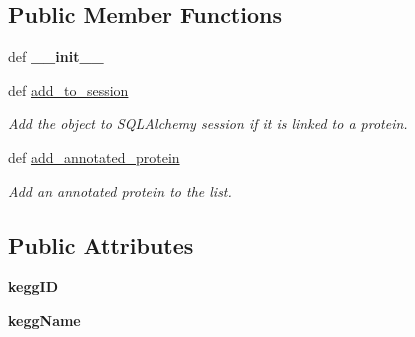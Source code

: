 \subsection*{Public Member Functions}
\begin{DoxyCompactItemize}
\item 
\hypertarget{classsrc_1_1fr_1_1tagc_1_1rainet_1_1core_1_1data_1_1KEGGPathway_1_1KEGGPathway_aebfe3b1e5b19192e4c587beee14c50f1}{def {\bfseries \-\_\-\-\_\-init\-\_\-\-\_\-}}\label{classsrc_1_1fr_1_1tagc_1_1rainet_1_1core_1_1data_1_1KEGGPathway_1_1KEGGPathway_aebfe3b1e5b19192e4c587beee14c50f1}

\item 
\hypertarget{classsrc_1_1fr_1_1tagc_1_1rainet_1_1core_1_1data_1_1KEGGPathway_1_1KEGGPathway_a569d7ef8d58fd928a53ba69b3360d332}{def \hyperlink{classsrc_1_1fr_1_1tagc_1_1rainet_1_1core_1_1data_1_1KEGGPathway_1_1KEGGPathway_a569d7ef8d58fd928a53ba69b3360d332}{add\-\_\-to\-\_\-session}}\label{classsrc_1_1fr_1_1tagc_1_1rainet_1_1core_1_1data_1_1KEGGPathway_1_1KEGGPathway_a569d7ef8d58fd928a53ba69b3360d332}

\begin{DoxyCompactList}\small\item\em Add the object to S\-Q\-L\-Alchemy session if it is linked to a protein. \end{DoxyCompactList}\item 
\hypertarget{classsrc_1_1fr_1_1tagc_1_1rainet_1_1core_1_1data_1_1KEGGPathway_1_1KEGGPathway_ab9820b7b31e392e1c4e7937dd0c1e9d1}{def \hyperlink{classsrc_1_1fr_1_1tagc_1_1rainet_1_1core_1_1data_1_1KEGGPathway_1_1KEGGPathway_ab9820b7b31e392e1c4e7937dd0c1e9d1}{add\-\_\-annotated\-\_\-protein}}\label{classsrc_1_1fr_1_1tagc_1_1rainet_1_1core_1_1data_1_1KEGGPathway_1_1KEGGPathway_ab9820b7b31e392e1c4e7937dd0c1e9d1}

\begin{DoxyCompactList}\small\item\em Add an annotated protein to the list. \end{DoxyCompactList}\end{DoxyCompactItemize}
\subsection*{Public Attributes}
\begin{DoxyCompactItemize}
\item 
\hypertarget{classsrc_1_1fr_1_1tagc_1_1rainet_1_1core_1_1data_1_1KEGGPathway_1_1KEGGPathway_af91ad118d445204630ce0a5375ea80fc}{{\bfseries kegg\-I\-D}}\label{classsrc_1_1fr_1_1tagc_1_1rainet_1_1core_1_1data_1_1KEGGPathway_1_1KEGGPathway_af91ad118d445204630ce0a5375ea80fc}

\item 
\hypertarget{classsrc_1_1fr_1_1tagc_1_1rainet_1_1core_1_1data_1_1KEGGPathway_1_1KEGGPathway_a0eab1a22463bd1429b70856918d9be87}{{\bfseries kegg\-Name}}\label{classsrc_1_1fr_1_1tagc_1_1rainet_1_1core_1_1data_1_1KEGGPathway_1_1KEGGPathway_a0eab1a22463bd1429b70856918d9be87}

\end{DoxyCompactItemize}
